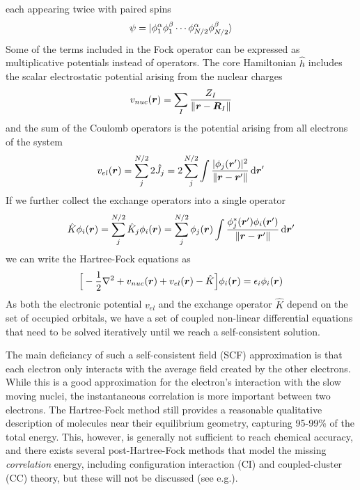 each appearing twice with paired spins
\begin{equation}
    \psi = |\phi_1^\alpha\phi_1^\beta\cdots
	    \phi_{N/2}^\alpha\phi_{N/2}^\beta\rangle
\end{equation}
Some of the terms included in the Fock operator can be expressed as multiplicative
potentials instead of operators. The core Hamiltonian $\hat{h}$ includes the scalar 
electrostatic potential arising from the nuclear charges
\begin{equation}
    \label{eq:nuc_pot}
    v_{nuc}(\boldsymbol r) = \sum_{I} \frac{Z_I}{\|\boldsymbol r - \boldsymbol R_I\|}
\end{equation}
and the sum of the Coulomb operators is the potential arising from all electrons of the system
\begin{equation}
    v_{el}(\boldsymbol r) = \sum_j^{N/2} 2\hat{J}_j = 2 \sum_j^{N/2} \int \frac{|\phi_j(\boldsymbol r')|^2}
	{\|\boldsymbol r - \boldsymbol r'\|} \,\mathrm{d} \boldsymbol r'
\end{equation}
If we further collect the exchange operators into a single operator
\begin{equation}
    \label{eq:HF_exchange}
    \hat{K}\phi_i(\boldsymbol r) = \sum_j^{N/2} \hat{K}_j \phi_i(\boldsymbol r) 
	= \sum_j^{N/2} \phi_j (\boldsymbol r) \int \frac{\phi_j^{\ast}(\boldsymbol r')\phi_i(\boldsymbol r')}
	    {\|\boldsymbol r - \boldsymbol r'\|} \,\mathrm{d} \boldsymbol r'
\end{equation}
we can write the Hartree-Fock equations as
\begin{equation}
    \label{eq:HF_equations}
    \Big[-\frac{1}{2}\nabla^2 + v_{nuc}(\boldsymbol r) + v_{el}(\boldsymbol r) - \hat{K}\Big]\phi_i(\boldsymbol r) 
	= \epsilon_i \phi_i(\boldsymbol r)
\end{equation}
As both the electronic potential $v_{el}$ and the exchange operator $\hat{K}$ depend on the 
set of occupied orbitals, we have a set of coupled non-linear differential equations that need 
to be solved iteratively until we reach a self-consistent solution. 

The main deficiancy of such a self-consistent field (SCF) approximation is that each electron 
only interacts with the average field created by the other electrons. While this is a good 
approximation for the electron's interaction with the slow moving nuclei, the instantaneous 
correlation is more important between two electrons. The Hartree-Fock method still provides 
a reasonable qualitative description of molecules near their equilibrium geometry, capturing 
95-99\% of the total energy.  This, however, is generally not sufficient to reach chemical 
accuracy, and there exists several post-Hartree-Fock methods that model the missing 
\emph{correlation} energy, including configuration interaction (CI) and coupled-cluster (CC)
theory, but these will not be discussed 
(see e.g.\cite{Szabo-Ostlund:1982,Jensen:2007,Helgaker:2000}).

